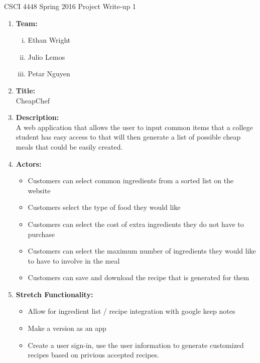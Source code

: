 \documentclass[12pt]{article}
\begin{document}
CSCI 4448 Spring 2016 \hfill Project Write-up 1\\

\hrulefill
\begin{enumerate}
\item\textbf{Team: }
\begin{enumerate}[i.]
\item Ethan Wright
\item Julio Lemos
\item Petar Nguyen
\end{enumerate}
\hrulefill
\item\textbf{Title:} \\
CheapChef \\
\hrulefill
\item\textbf{Description: } \\
A web application that allows the user to input common items that a college student has easy
access to that will then generate a list of possible cheap meals that could be easily created. \\
\hrulefill
\item\textbf{Actors: } \\
\begin{itemize}
\item Customers can select common ingredients from a sorted list on the website
\item Customers select the type of food they would like
\item Customers can select the cost of extra ingredients they do not have to purchase
\item Customers can select the maximum number of ingredients they would like to have to involve in the meal
\item Customers can save and download the recipe that is generated for them
\end{itemize}
\hrulefill
\item\textbf{Stretch Functionality: } \\
\begin{itemize}
\item Allow for ingredient list / recipe integration with google keep notes
\item Make a version as an app
\item Create a user sign-in, use the user information to generate customized recipes based on privious accepted recipes. 
\end{itemize}


\end{enumerate}
\end{document}
